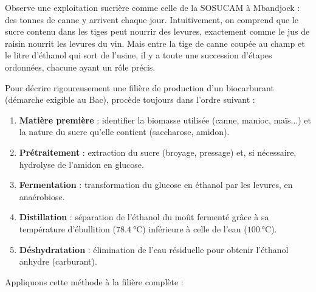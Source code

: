 \documentclass[11pt]{article}
\begin{document}
Observe une exploitation sucrière comme celle de la SOSUCAM à Mbandjock : des tonnes de canne y arrivent chaque jour. Intuitivement, on comprend que le sucre contenu dans les tiges peut nourrir des levures, exactement comme le jus de raisin nourrit les levures du vin. Mais entre la tige de canne coupée au champ et le litre d'éthanol qui sort de l'usine, il y a toute une succession d'étapes ordonnées, chacune ayant un rôle précis.

\begin{methode}
Pour décrire rigoureusement une filière de production d'un biocarburant (démarche exigible au Bac), procède toujours dans l'ordre suivant :
\begin{enumerate}
\item \textbf{Matière première} : identifier la biomasse utilisée (canne, manioc, maïs...) et la nature du sucre qu'elle contient (saccharose, amidon).
\item \textbf{Prétraitement} : extraction du sucre (broyage, pressage) et, si nécessaire, hydrolyse de l'amidon en glucose.
\item \textbf{Fermentation} : transformation du glucose en éthanol par les levures, en anaérobiose.
\item \textbf{Distillation} : séparation de l'éthanol du moût fermenté grâce à sa température d'ébullition ($\SI{78,4}{\celsius}$) inférieure à celle de l'eau ($\SI{100}{\celsius}$).
\item \textbf{Déshydratation} : élimination de l'eau résiduelle pour obtenir l'éthanol anhydre (carburant).
\end{enumerate}
\end{methode}

Appliquons cette méthode à la filière complète :
\end{document}
